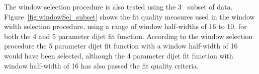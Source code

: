 %

The window selection procedure is also tested using the 3~\ifb{} subset of data.
Figure~\ref{fig:windowSel_subset} shows the fit quality measures used in the window width selection procedure,
using a range of window half-widths of 16 to 10, for both the 4 and 5 parameter dijet fit function.
According to the window selection procedure the 5 parameter dijet fit function with a window half-width of 16 would have been selected,
although the 4 parameter dijet fit function with window half-width of 16 has also passed the fit quality criteria.

